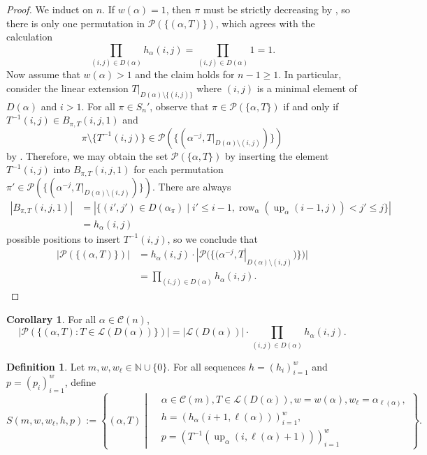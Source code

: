 \documentclass[12pt]{amsart}
\DeclareMathOperator{\row}{row}
\DeclareMathOperator{\upof}{up}
\theoremstyle{definition}
\newtheorem{corollary}[theorem]{Corollary}
\newtheorem{definition}[theorem]{Definition}
\begin{document}
\begin{proof}
We induct on $n$. If $w(\alpha)=1$, then $\pi$ must be strictly decreasing by , so there is only one permutation in $\mathcal{P}(\{(\alpha,T)\})$, which agrees with the calculation
\[\prod_{(i,j)\in D(\alpha)}h_{\alpha}(i,j)=\prod_{(i,j)\in D(\alpha)}1=1.\] Now assume that $w(\alpha)>1$ and the claim holds for $n-1\ge 1$. In particular, consider the linear extension $T|_{D(\alpha)\setminus \{(i,j)\}}$ where $(i,j)$ is a minimal element of $D(\alpha)$ and $i>1$. For all $\pi\in S_n'$, observe that $\pi\in\mathcal{P}(\{\alpha,T\})$ if and only if $T^{-1}(i,j)\in B_{\pi,T}(i,j,1)$ and 
\[\pi\setminus \{T^{-1}(i,j)\}\in \mathcal{P}(\{(\alpha^{-j},T|_{D(\alpha)\setminus (i,j)})\})\]
by . Therefore, we may obtain the set $\mathcal{P}(\{\alpha, T\})$ by inserting the element $T^{-1}(i,j)$ into $B_{\pi,T}(i,j,1)$ for each permutation $\pi'\in\mathcal{P}(\{(\alpha^{-j},T|_{D(\alpha)\setminus (i,j)})\})$. There are always
\begin{align*}
|B_{\pi,T}(i,j,1)| &=|\{(i',j')\in D(\alpha_{\pi})\mid i'\le i-1,\row_{\alpha}(\upof_{\alpha}(i-1,j))<j'\le j\}| \\
&=h_{\alpha}(i,j)
\end{align*}
possible positions to insert $T^{-1}(i,j)$, so we conclude that
\begin{align*}
|\mathcal{P}(\{(\alpha,T)\})| &= h_{\alpha}(i,j)\cdot |\mathcal{P}(\{(\alpha^{-j},T|_{D(\alpha)\setminus (i,j)})\})| \\
&=\prod_{(i,j)\in D(\alpha)}h_{\alpha}(i,j).
\end{align*}
\end{proof}
\begin{corollary}
For all $\alpha\in\mathcal{C}(n)$,
\[|\mathcal{P}(\{(\alpha,T):T\in\mathcal{L}(D(\alpha))\})|=|\mathcal{L}(D(\alpha))|\cdot\prod_{(i,j)\in D(\alpha)}h_{\alpha}(i,j).\]
\end{corollary}
\begin{definition}
Let $m,w,w_{\ell}\in\mathbb{N}\cup\{0\}$. For all sequences $h=(h_i)_{i=1}^w$ and $p=(p_i)_{i=1}^w$, define
\[S(m,w,w_{\ell},h,p):=\left\{(\alpha, T)\middle| \begin{aligned}&\alpha\in\mathcal{C}(m),T\in\mathcal{L}(D(\alpha)),w=w(\alpha),w_{\ell}=\alpha_{\ell(\alpha)},\\&h=(h_{\alpha}(i+1,\ell(\alpha)))_{i=1}^w,\\& p=(T^{-1}(\upof_{\alpha}(i,\ell(\alpha)+1)))_{i=1}^{w}\end{aligned}\right\}.\]
\end{definition}
\end{document}
